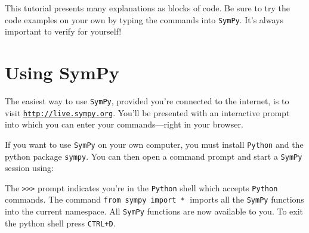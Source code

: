 

This tutorial presents many explanations as blocks of code. 
Be sure to try the code examples on your own by typing the commands into \texttt{SymPy}.
It's always important to verify for yourself!



\section*{Using SymPy}

The easiest way to use \texttt{SymPy},
provided you're connected to the internet,
is to visit \href{http://live.sympy.org}{\texttt{http://live.sympy.org}}.
You'll be presented with an interactive prompt into which
you can enter your commands---right in your browser. 

If you want to use \texttt{SymPy} on your own computer,
you must install \texttt{Python} and the python package \texttt{sympy}.
You can then open a command prompt and start a \texttt{SymPy} session using:



\small
{}
\normalsize

\noindent
The \texttt{>{}>{}>} prompt indicates you're in the \texttt{Python} shell which accepts \texttt{Python} commands.
The command \texttt{from sympy import *}$\;$ imports all the \texttt{SymPy} functions into the current namespace. 
All \texttt{SymPy} functions are now available to you.
%
To exit the python shell press \texttt{CTRL+D}. 
%

